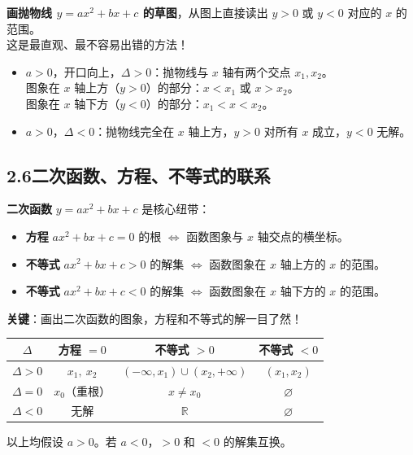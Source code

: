 \documentclass[12pt, a4paper]{ctexart}
\begin{document}
\begin{tipbox}[一元二次不等式的图象理解法]
\textbf{画抛物线 $y = ax^2 + bx + c$ 的草图}，从图上直接读出 $y > 0$ 或 $y < 0$ 对应的 $x$ 的范围。\\
这是最直观、最不容易出错的方法！
\begin{itemize}[leftmargin=2em]
  \item $a > 0$，开口向上，$\Delta > 0$：抛物线与 $x$ 轴有两个交点 $x_1, x_2$。\\
    图象在 $x$ 轴上方（$y > 0$）的部分：$x < x_1$ 或 $x > x_2$。\\
    图象在 $x$ 轴下方（$y < 0$）的部分：$x_1 < x < x_2$。
  \item $a > 0$，$\Delta < 0$：抛物线完全在 $x$ 轴上方，$y > 0$ 对所有 $x$ 成立，$y < 0$ 无解。
\end{itemize}
\end{tipbox}

\subsection*{2.6\quad 二次函数、方程、不等式的联系}

\begin{knowledgebox}[三者之间的关系]
\textbf{二次函数} $y = ax^2 + bx + c$ 是核心纽带：
\begin{itemize}[leftmargin=2em]
  \item \textbf{方程} $ax^2 + bx + c = 0$ 的根 $\Leftrightarrow$ 函数图象与 $x$ 轴交点的横坐标。
  \item \textbf{不等式} $ax^2 + bx + c > 0$ 的解集 $\Leftrightarrow$ 函数图象在 $x$ 轴上方的 $x$ 的范围。
  \item \textbf{不等式} $ax^2 + bx + c < 0$ 的解集 $\Leftrightarrow$ 函数图象在 $x$ 轴下方的 $x$ 的范围。
\end{itemize}
\textbf{关键}：画出二次函数的图象，方程和不等式的解一目了然！
\end{knowledgebox}

\begin{tipbox}
\begin{center}
\renewcommand{\arraystretch}{1.4}
\begin{tabular}{c|c|c|c}
\toprule
$\Delta$ & 方程 $= 0$ & 不等式 $> 0$ & 不等式 $< 0$ \\
\midrule
$\Delta > 0$ & $x_1,\ x_2$ & $(-\infty, x_1) \cup (x_2, +\infty)$ & $(x_1, x_2)$ \\
$\Delta = 0$ & $x_0$（重根） & $x \neq x_0$ & $\varnothing$ \\
$\Delta < 0$ & 无解 & $\mathbb{R}$ & $\varnothing$ \\
\bottomrule
\end{tabular}
\end{center}
以上均假设 $a > 0$。若 $a < 0$，$> 0$ 和 $< 0$ 的解集互换。
\end{tipbox}
\end{document}
